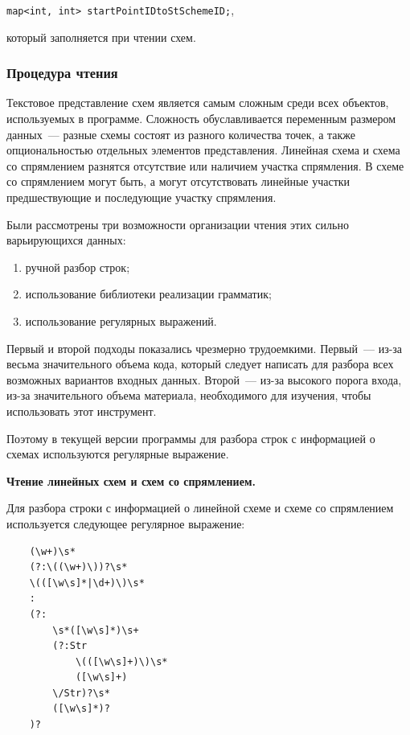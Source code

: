 \documentclass[12pt]{article}
\theoremstyle{plain}
\begin{document}
\centerline{\texttt{map<int, int> startPointIDtoStSchemeID;},}

\noindent
который заполняется при чтении схем.


\subsubsection{Процедура чтения}
\label{sec:ReadingSchemes}

Текстовое представление схем является самым сложным среди всех объектов, используемых в программе. Сложность обуславливается переменным размером данных~--- разные схемы состоят из разного количества точек, а также опциональностью отдельных элементов представления. Линейная схема и схема со спрямлением разнятся отсутствие или наличием участка спрямления. В схеме со спрямлением могут быть, а могут отсутствовать линейные участки предшествующие и последующие участку спрямления. 

Были рассмотрены три возможности организации чтения этих сильно варьирующихся данных:
\begin{enumerate}[topsep=-0.5\parsep,itemsep=-0.5\parsep]
  \item ручной разбор строк;
  \item использование библиотеки реализации грамматик;
  \item использование регулярных выражений.
\end{enumerate}

Первый и второй подходы показались чрезмерно трудоемкими. Первый~--- из-за весьма значительного объема кода, который следует написать для разбора всех возможных вариантов входных данных. Второй~--- из-за высокого порога входа, из-за значительного объема материала, необходимого для изучения, чтобы использовать этот инструмент.

Поэтому в текущей версии программы для разбора строк с информацией о схемах используются регулярные выражение.

\medskip

\noindent
\textbf{Чтение линейных схем и схем со спрямлением.}

Для разбора строки с информацией о линейной схеме и схеме со спрямлением используется следующее регулярное выражение:
\begin{verbatim}
    (\w+)\s*
    (?:\((\w+)\))?\s*
    \(([\w\s]*|\d+)\)\s*
    :
    (?:
        \s*([\w\s]*)\s+
        (?:Str
            \(([\w\s]+)\)\s*
            ([\w\s]+)
        \/Str)?\s*
        ([\w\s]*)?
    )?
\end{verbatim}
\end{document}
